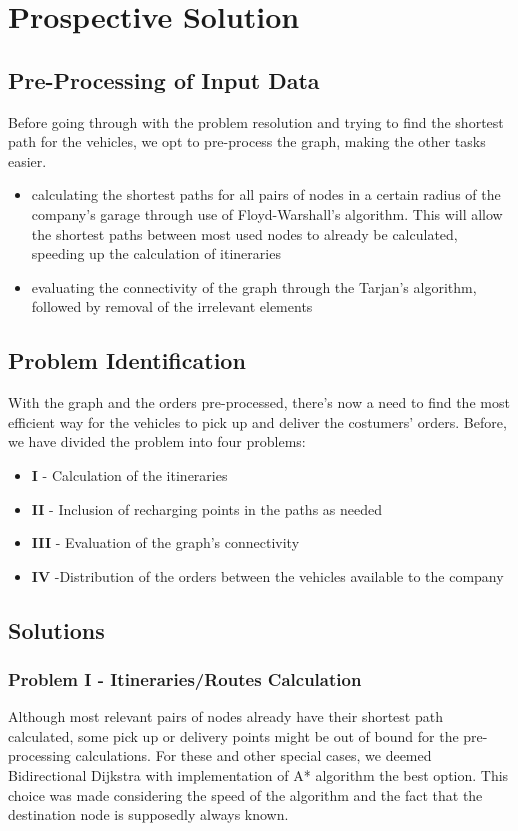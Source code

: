 \chapter{Prospective Solution}


\section{Pre-Processing of Input Data}
Before going through with the problem resolution and trying to find the shortest path for the vehicles, we opt to pre-process the graph, making the other tasks easier.

\begin{itemize}
    \item calculating the shortest paths for all pairs of nodes in a certain radius of the company's garage through use of Floyd-Warshall's algorithm. This will allow the shortest paths between most used nodes to already be calculated, speeding up the calculation of itineraries
    \item evaluating the connectivity of the graph through the Tarjan's algorithm,  followed by removal of the irrelevant elements
\end{itemize}


\section{Problem Identification}

With the graph and the orders pre-processed, there's now a need to find the most efficient way for the vehicles to pick up and deliver the costumers' orders. Before, we have divided the problem into four problems:
\begin{itemize}
    \item \textbf{I} - Calculation of the itineraries
    \item \textbf{II} - Inclusion of recharging points in the paths as needed
    \item \textbf{III} - Evaluation of the graph's connectivity
    \item \textbf{IV} -Distribution of the orders between the vehicles available to the company
\end{itemize}


\section{Solutions}

\subsection{Problem I - Itineraries/Routes Calculation}
Although most relevant pairs of nodes already have their shortest path calculated, some pick up or delivery points might be out of bound for the pre-processing calculations. For these and other special cases, we deemed Bidirectional Dijkstra with implementation of A* algorithm the best option. This choice was made considering the speed of the algorithm and the fact that the destination node is supposedly always known. 

